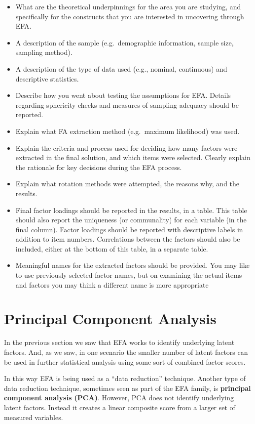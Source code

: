 \documentclass[
]{book}
\providecommand{\tightlist}{%
  \setlength{\itemsep}{0pt}\setlength{\parskip}{0pt}}
\begin{document}
\begin{itemize}
\tightlist
\item
  What are the theoretical underpinnings for the area you are studying, and specifically for the constructs that you are interested in uncovering through EFA.
\item
  A description of the sample (e.g.~demographic information, sample size, sampling method).
\item
  A description of the type of data used (e.g., nominal, continuous) and descriptive statistics.
\item
  Describe how you went about testing the assumptions for EFA. Details regarding sphericity checks and measures of sampling adequacy should be reported.
\item
  Explain what FA extraction method (e.g.~maximum likelihood) was used.
\item
  Explain the criteria and process used for deciding how many factors were extracted in the final solution, and which items were selected. Clearly explain the rationale for key decisions during the EFA process.
\item
  Explain what rotation methods were attempted, the reasons why, and the results.
\item
  Final factor loadings should be reported in the results, in a table. This table should also report the uniqueness (or communality) for each variable (in the final column). Factor loadings should be reported with descriptive labels in addition to item numbers. Correlations between the factors should also be included, either at the bottom of this table, in a separate table.
\item
  Meaningful names for the extracted factors should be provided. You may like to use previously selected factor names, but on examining the actual items and factors you may think a different name is more appropriate
\end{itemize}

\hypertarget{PCA}{%
\section{Principal Component Analysis}\label{PCA}}

In the previous section we saw that EFA works to identify underlying latent factors. And, as we saw, in one scenario the smaller number of latent factors can be used in further statistical analysis using some sort of combined factor scores.

In this way EFA is being used as a ``data reduction'' technique. Another type of data reduction technique, sometimes seen as part of the EFA family, is {\textbf{principal component analysis (PCA)}}. However, PCA does not identify underlying latent factors. Instead it creates a linear composite score from a larger set of measured variables.
\end{document}
